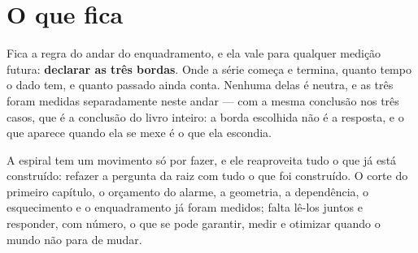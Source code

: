 \section{O que fica}

Fica a regra do andar do enquadramento, e ela vale para qualquer medição futura: \textbf{declarar as três
bordas}. Onde a série começa e termina, quanto tempo o dado tem, e quanto passado ainda conta.
Nenhuma delas é neutra, e as três foram medidas separadamente neste andar --- com a mesma conclusão
nos três casos, que é a conclusão do livro inteiro: a borda escolhida não é a resposta, e o que
aparece quando ela se mexe é o que ela escondia.

A espiral tem um movimento só por fazer, e ele reaproveita tudo o que já está construído: refazer a pergunta da
raiz com tudo o que foi construído. O corte do primeiro capítulo, o orçamento do alarme, a
geometria, a dependência, o esquecimento e o enquadramento já foram medidos; falta lê-los juntos e
responder, com número, o que se pode garantir, medir e otimizar quando o mundo não para de mudar.
